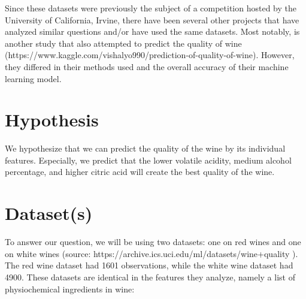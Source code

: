 \documentclass[11pt]{article}
\begin{document}
Since these datasets were previously the subject of a competition hosted
by the University of California, Irvine, there have been several other
projects that have analyzed similar questions and/or have used the same
datasets. Most notably, is another study that also attempted to predict
the quality of wine
(https://www.kaggle.com/vishalyo990/prediction-of-quality-of-wine).
However, they differed in their methods used and the overall accuracy of
their machine learning model.

    \section{Hypothesis}\label{hypothesis}

    We hypothesize that we can predict the quality of the wine by its
individual features. Especially, we predict that the lower volatile
acidity, medium alcohol percentage, and higher citric acid will create
the best quality of the wine.

    \section{Dataset(s)}\label{datasets}

    To answer our question, we will be using two datasets: one on red wines
and one on white wines (source:
https://archive.ics.uci.edu/ml/datasets/wine+quality ). The red wine
dataset had 1601 observations, while the white wine dataset had 4900.
These datasets are identical in the features they analyze, namely a list
of physiochemical ingredients in wine:
\end{document}
